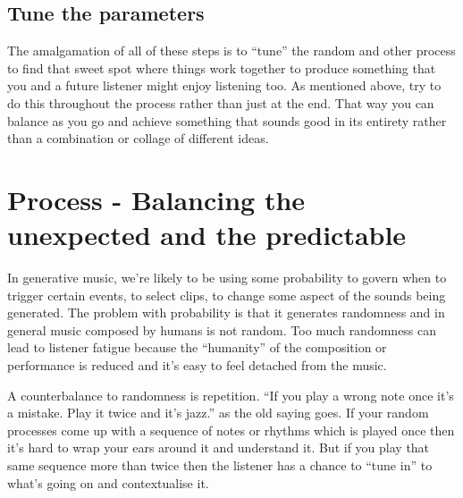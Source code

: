\documentclass[
  12pt,
  letterpaper,
  oneside,
  open=any]{scrbook}
\begin{document}
\section{Tune the parameters}\label{tune-the-parameters}

The amalgamation of all of these steps is to ``tune'' the random and
other process to find that sweet spot where things work together to
produce something that you and a future listener might enjoy listening
too. As mentioned above, try to do this throughout the process rather
than just at the end. That way you can balance as you go and achieve
something that sounds good in its entirety rather than a combination or
collage of different ideas.


\chapter{Process - Balancing the unexpected and the
predictable}\label{Chapter-009-Process-Balance_unexpected_and_predictable}

In generative music, we're likely to be using some probability to govern
when to trigger certain events, to select clips, to change some aspect
of the sounds being generated. The problem with probability is that it
generates randomness and in general music composed by humans is not
random. Too much randomness can lead to listener fatigue because the
``humanity'' of the composition or performance is reduced and it's easy
to feel detached from the music.

A counterbalance to randomness is repetition. ``If you play a wrong note
once it's a mistake. Play it twice and it's jazz.'' as the old saying
goes. If your random processes come up with a sequence of notes or
rhythms which is played once then it's hard to wrap your ears around it
and understand it. But if you play that same sequence more than twice
then the listener has a chance to ``tune in'' to what's going on and
contextualise it.
\end{document}
